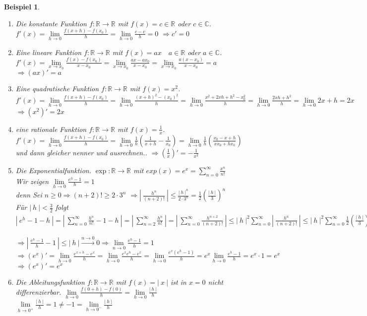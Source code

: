 \documentclass[a4paper,titlepage,oneside]{article}
\def\C{\ensuremath{\mathbb{C}} }
\def\R{\ensuremath{\mathbb{R}} }
\def\e{\ensuremath{\mathit{e}} }
\newcommand{\suminf}[2][n]{\ensuremath{\sum_{#1= 0}^{\infty}{#2}}}
\newcommand{\limnull}[2][n]{\ensuremath{\lim\limits_{#1 \rightarrow 0}{#2}}}
\newcommand{\limAB}[3][x]{\ensuremath{\lim\limits_{#1 \rightarrow #2}{#3}}}
\newcommand{\limA}[2][x_0]{\limAB{#1}{#2}}
\newcommand{\limpos}[2][n]{\ensuremath{\lim\limits_{#1 \rightarrow 0^+}{#2}}}
\newcommand{\limneg}[2][n]{\ensuremath{\lim\limits_{#1 \rightarrow 0^-}{#2}}}
\newcommand{\abs}[1]{\ensuremath{\left|\:#1\:\right|}}
\newcommand{\longtonull}[1][n]{\ensuremath{\overset{\scriptscriptstyle{#1 \to 0}}{\longrightarrow}}}
\theoremstyle{thmstyle}
\newtheorem{bsp}[satz]{Beispiel}
\begin{document}
\begin{bsp}
\begin{enumerate}
\item Die konstante Funktion
$f: \R \to \R$ mit $ f(x) = c \in \R $ oder $ c \in \C $. $f'(x) = \limnull[h]{\frac{f(x + h) - f(x_0)}{h}} = \limnull[h]{\frac{c-c}{h}} = 0$
$\Rightarrow c' = 0$
\item Eine lineare Funktion
$f: \R \to \R$ mit $ f(x) = ax \quad a \in \R $ oder $ a \in \C $. $f'(x) = \limA{\frac{f(x) - f(x_0)}{x-x_0}} = \limA{\frac{ax - ax_0}{x-x_0}} = \limA{\frac{a(x-x_0)}{x-x_0}} = a$
$\Rightarrow (ax)' = a$
\item Eine quadratische Funktion
$f: \R \to \R$ mit $ f(x) = x^2 $. $f'(x) = \limnull[h]{\frac{f(x + h) - f(x_0)}{h}} = \limnull[h]{\frac{(x + h)^2 - (x_0)^2}{h}} = \limnull[h]{\frac{x^2 + 2xh + h^2 - x_0^2}{h}} =  \limnull[h]{\frac{2xh + h^2}{h}} = \limnull[h]{2x + h}  = 2x$
$\Rightarrow (x^2)' = 2x$
\item eine rationale Funktion
$f: \R \to \R$ mit $ f(x) = \frac{1}{x} $. $f'(x) = \limnull[h]{\frac{f(x + h) - f(x_0)}{h}} = \limnull[h]{\frac{1}{h}\left(\frac{1}{x + h} - \frac{1}{x_0}\right)} = \limnull[h]{\frac{1}{h}\left(\frac{x_0- x +h}{xx_0 + hx_0}\right)} $ und dann gleicher nenner und ausrechnen..
$\Rightarrow \left(\frac{1}{x}\right)' = -\frac{1}{x^2}$
\item Die Exponentialfunktion.
$\exp: \R \to \R$ mit $exp(x) = \e^x = \suminf{\frac{x^n}{n!}}$ \\
Wir zeigen $\limnull[h]{\frac{e^h - 1}{h}} = 1$\\
denn Sei $n \ge 0 \Rightarrow (n+2)! \ge 2 \cdot 3^n$
$\Rightarrow \abs{\frac{h^n}{(n+2)!}} \le \frac{\abs{h}^n}{2\cdot 3^n} = \frac{1}{2}\left(\frac{\abs{h}}{3}\right)^n$\\
Für $\displaystyle \abs{h} < \frac{3}{2}$ folgt $ \abs{\e^h - 1 - h} = \abs{\suminf{\frac{h^n}{n!}} - 1- h} = \abs{\sum_{n=2}^{\infty}{\frac{h^n}{n!}}} = \abs{\suminf{\frac{h^{n+2}}{(n+2)!}}} \le \abs{h}^2 \suminf{\abs{\frac{h^n}{(n+2)!}}} \le \abs{h}^2\suminf{\frac{1}{2}\left(\frac{\abs{h}}{3}\right)^h} = \frac{\abs{h}^2}{2}\suminf{\underbrace{\left(\frac{\abs{h}}{3}\right)^h}_{<1}} \overset{\text{geometrische Reihe}}{=} = \frac{\abs{h}^2}{2} \frac{1}{1-\underbrace{\frac{\abs{h}}{3}}_{< \frac{1}{2}}} \le \abs{h^2}$\\
$\Rightarrow \abs{\frac{e^h - 1}{h} - 1} \le \abs{h} \longtonull 0 \Rightarrow \limnull{\frac{e^h - 1}{h}} = 1$ \\
$\Rightarrow (\e^x)' = \limnull[h]{\frac{\e^{x+h} - \e^x}{h}} = \limnull[h]{\frac{\e^x\e^h-\e^x}{h}} = \limnull[h]{\frac{\e^x(\e^h-1)}{h}} = \e^x\limnull[h]{\frac{\e^h-1}{h}} = \e^x \cdot 1 = \e^x$\\
$\Rightarrow (\e^x)' = \e^x $
\item Die Ableitungsfunktion
$f: \R \to \R$ mit $ f(x) = \abs{x} $ ist in $ x = 0$ nicht differenzierbar. $\limnull[h]{\frac{f(0 + h) - f(0)}{h}} = \limnull[h]{\frac{\abs{h}}{h}}$\\
$\limpos[h]{\frac{\abs{h}}{h}} = 1 \ne -1 = \limneg[h]{\frac{\abs{h}}{h}}$
\end{enumerate}
\end{bsp}
\end{document}
